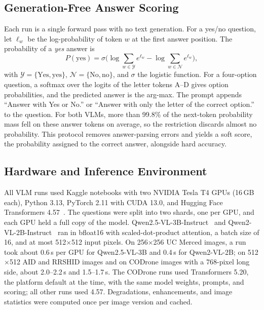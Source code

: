 \documentclass[lettersize,journal]{IEEEtran}
\begin{document}
\subsection{Generation-Free Answer Scoring}

Each run is a single forward pass with no text generation. For a yes/no question, let $\ell_w$ be the log-probability of token $w$ at the first answer position. The probability of a \emph{yes} answer is
\begin{equation}
P(\text{yes}) = \sigma\!\Big(\log\!\sum_{w \in \mathcal{Y}} e^{\ell_w} - \log\!\sum_{w \in \mathcal{N}} e^{\ell_w}\Big),
\label{eq:yesno}
\end{equation}
with $\mathcal{Y} = \{\text{Yes}, \text{yes}\}$, $\mathcal{N} = \{\text{No}, \text{no}\}$, and $\sigma$ the logistic function. For a four-option question, a softmax over the logits of the letter tokens A--D gives option probabilities, and the predicted answer is the arg-max. The prompt appends ``Answer with Yes or No.'' or ``Answer with only the letter of the correct option.'' to the question. For both VLMs, more than 99.8\% of the next-token probability mass fell on these answer tokens on average, so the restriction discards almost no probability. This protocol removes answer-parsing errors and yields a soft score, the probability assigned to the correct answer, alongside hard accuracy.

\subsection{Hardware and Inference Environment}

All VLM runs used Kaggle notebooks with two NVIDIA Tesla T4 GPUs (16\,GB each), Python 3.13, PyTorch 2.11 with CUDA 13.0, and Hugging Face Transformers 4.57~\cite{wolf2020transformers}. The questions were split into two shards, one per GPU, and each GPU held a full copy of the model. Qwen2.5-VL-3B-Instruct~\cite{bai2025qwen25vl} and Qwen2-VL-2B-Instruct~\cite{wang2024qwen2vl} ran in bfloat16 with scaled-dot-product attention, a batch size of 16, and at most 512$\times$512 input pixels. On 256$\times$256 UC Merced images, a run took about 0.6\,s per GPU for Qwen2.5-VL-3B and 0.4\,s for Qwen2-VL-2B; on 512$\times$512 AID and RRSHID images and on CODrone images with a 768-pixel long side, about 2.0--2.2\,s and 1.5--1.7\,s. The CODrone runs used Transformers 5.20, the platform default at the time, with the same model weights, prompts, and scoring; all other runs used 4.57. Degradations, enhancements, and image statistics were computed once per image version and cached.
\end{document}

